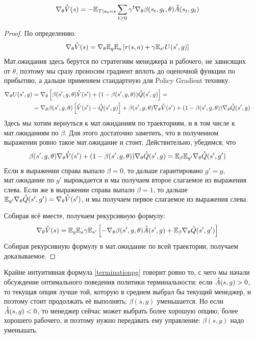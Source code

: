 \begin{theorem}
\begin{equation}\label{terminationpg}
\nabla_{\theta} \accentset{\star}{V}(s) = -\mathbb{E}_{\mathcal{T} \mid s_0 = s} \sum_{t \ge 0} \gamma^t \nabla_\theta \beta(s_t, g_t, \theta) \accentset{\star}{A}(s_t, g_t)
\end{equation}
\begin{proof}
По определению:
$$\nabla_{\theta} \accentset{\star}{V}(s) = \nabla_{\theta} \mathbb{E}_{g} \mathbb{E}_{a} \left[ r(s, a) + \gamma \mathbb{E}_{s'} U(s', g)\right]$$
Мат.ожидания здесь берутся по стратегиям менеджера и рабочего, не зависящих от $\theta$, поэтому мы сразу проносим градиент вплоть до оценочной функции по прибытию, а дальше применяем стандартную для Policy Gradient технику.
\begin{align*}
\nabla_{\theta} U(s', g) &= \nabla_{\theta} \left[\beta(s', g, \theta) \accentset{\star}{V}(s') + (1 - \beta(s', g, \theta)) \accentset{\star}{Q}(s', g) \right] = \\
 &= \nabla_{\theta} \beta(s', g, \theta) \left[\accentset{\star}{V}(s') - \accentset{\star}{Q}(s', g) \right] + \beta(s', g, \theta) \nabla_{\theta} \accentset{\star}{V}(s') + (1 - \beta(s', g, \theta)) \nabla_{\theta} \accentset{\star}{Q}(s', g)
\end{align*}
Здесь мы хотим вернуться к мат.ожиданиям по траекториям, и в том числе к мат.ожиданиям по $\beta$. Для этого достаточно заметить, что в полученном выражении ровно такое мат.ожидание и стоит. Действительно, убедимся, что
$$\beta(s', g, \theta) \nabla_{\theta} \accentset{\star}{V}(s') + (1 - \beta(s', g, \theta)) \nabla_{\theta} \accentset{\star}{Q}(s', g) = \mathbb{E}_{\beta} \mathbb{E}_{g'} \nabla_{\theta} \accentset{\star}{Q}(s', g')$$
Если в выражении справа выпало $\beta = 0$, то дальше гарантировано $g' = g$, мат.ожидание по $g'$ вырождается и мы получаем второе слагаемое из выражения слева. Если же в выражении справа выпало $\beta = 1$, то дальше $\mathbb{E}_{g'} \nabla_{\theta} \accentset{\star}{Q}(s', g') = \nabla_{\theta} \accentset{\star}{V}(s')$, и мы получаем первое слагаемое из выражения слева.

Собирая всё вместе, получаем рекурсивную формулу:
$$\nabla_{\theta} \accentset{\star}{V}(s) = \mathbb{E}_{g} \mathbb{E}_{a} \gamma \mathbb{E}_{s'}  \left[ - \nabla_{\theta}\beta(s', g, \theta) \accentset{\star}{A}(s', g) + \mathbb{E}_{\beta} \nabla_{\theta} \accentset{\star}{Q}(s', g') \right] $$
Собирая рекурсивную формулу в мат.ожидание по всей траектории, получаем доказываемое.
\end{proof}
\end{theorem}

Крайне интуитивная формула \eqref{terminationpg} говорит ровно то, с чего мы начали обсуждение оптимального поведения политики терминальности: если $\manager{A}(s, g) \HM> 0$, то текущая опция лучше той, которую в среднем выбрал бы текущий менеджер, и поэтому стоит продолжать её выполнять; $\beta(s, g)$ уменьшается. Но если $\accentset{\star}{A}(s, g) < 0$, то менеджер сейчас может выбрать более хорошую опцию, более хорошего рабочего, и поэтому нужно передавать ему управление: $\beta(s, g)$ надо уменьшать.

